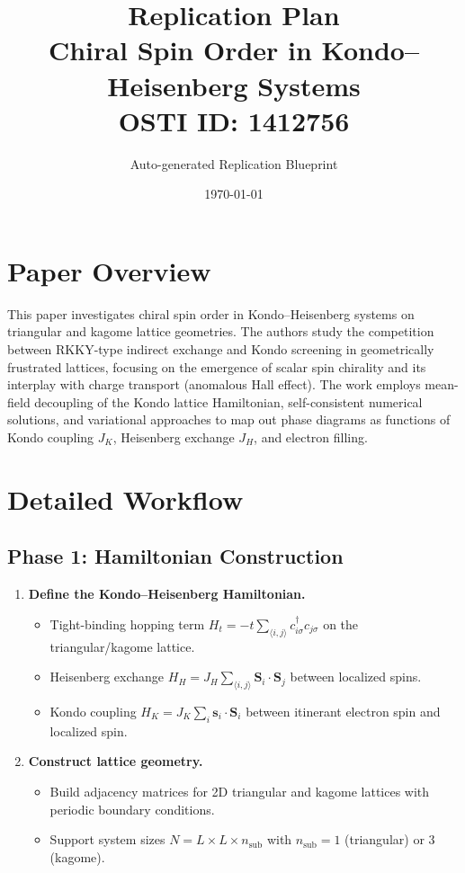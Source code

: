 \documentclass[11pt,a4paper]{article}
\title{\textbf{Replication Plan}\\[0.5em]
\large Chiral Spin Order in Kondo--Heisenberg Systems\\[0.3em]
\normalsize OSTI ID: 1412756}
\author{Auto-generated Replication Blueprint}
\date{\today}
\begin{document}
\maketitle
\tableofcontents
\newpage

\section{Paper Overview}
This paper investigates chiral spin order in Kondo--Heisenberg systems on triangular and kagome lattice geometries. The authors study the competition between RKKY-type indirect exchange and Kondo screening in geometrically frustrated lattices, focusing on the emergence of scalar spin chirality and its interplay with charge transport (anomalous Hall effect). The work employs mean-field decoupling of the Kondo lattice Hamiltonian, self-consistent numerical solutions, and variational approaches to map out phase diagrams as functions of Kondo coupling $J_K$, Heisenberg exchange $J_H$, and electron filling.

\section{Detailed Workflow}

\subsection{Phase 1: Hamiltonian Construction}
\begin{enumerate}[label=\textbf{1.\arabic*}]
  \item \textbf{Define the Kondo--Heisenberg Hamiltonian.}
    \begin{itemize}
      \item Tight-binding hopping term $H_t = -t \sum_{\langle i,j\rangle} c^\dagger_{i\sigma} c_{j\sigma}$ on the triangular/kagome lattice.
      \item Heisenberg exchange $H_H = J_H \sum_{\langle i,j\rangle} \mathbf{S}_i \cdot \mathbf{S}_j$ between localized spins.
      \item Kondo coupling $H_K = J_K \sum_i \mathbf{s}_i \cdot \mathbf{S}_i$ between itinerant electron spin and localized spin.
    \end{itemize}
  \item \textbf{Construct lattice geometry.}
    \begin{itemize}
      \item Build adjacency matrices for 2D triangular and kagome lattices with periodic boundary conditions.
      \item Support system sizes $N = L \times L \times n_{\text{sub}}$ with $n_{\text{sub}} = 1$ (triangular) or $3$ (kagome).
    \end{itemize}
\end{enumerate}
\end{document}
